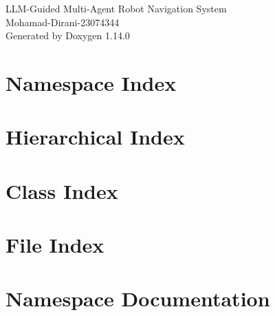 \documentclass[twoside]{book}
\newcommand{\+}{\discretionary{\mbox{\scriptsize$\hookleftarrow$}}{}{}}
\newcommand{\clearemptydoublepage}{%
    \newpage{\pagestyle{empty}\cleardoublepage}%
  }
\begin{document}
  \raggedbottom
    \hypersetup{pageanchor=false,
                bookmarksnumbered=true,
                pdfencoding=unicode
               }
  \begin{titlepage}
  \vspace*{7cm}
  \begin{center}%
  {\Large LLM-\/\+Guided Multi-\/\+Agent Robot Navigation System}\\
  [1ex]\large Mohamad-\/\+Dirani-\/23074344 \\
  \vspace*{1cm}
  {\large Generated by Doxygen 1.14.0}\\
  \end{center}
  \end{titlepage}
  \clearemptydoublepage
  \tableofcontents
  \clearemptydoublepage
  \hypersetup{pageanchor=true}
\chapter{Namespace Index}

\chapter{Hierarchical Index}

\chapter{Class Index}

\chapter{File Index}

\chapter{Namespace Documentation}





























\end{document}
